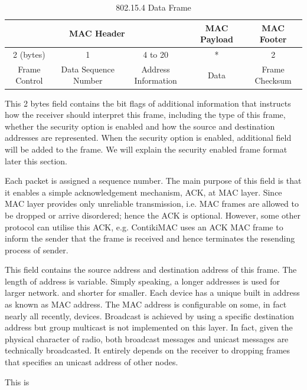 \begin{table}[]
\centering
\begin{tabular}{|c|c|c|c|c|}
\hline
\multicolumn{3}{|c|}{MAC Header}                           & MAC Payload & MAC Footer     \\ \hline
2 (bytes)     & 1                    & 4 to 20              & *           & 2              \\ \hline
Frame Control & Data Sequence Number & Address Information & Data        & Frame Checksum \\ \hline
\end{tabular}
\caption{802.15.4 Data Frame}
\label{Tbl: 802154 frame}
\end{table}

\begin{description}[style=nextline]
\item[\textbf{Frame Control}]
This 2 bytes field contains the bit flags of additional information that instructs how the receiver should interpret this frame, including the type of this frame, whether the security option is enabled and how the source and destination addresses are represented. When the security option is enabled, additional field will be added to the frame. We will explain the security enabled frame format later this section.

\item[\textbf{Data Sequence Number}]
Each packet is assigned a sequence number. The main purpose of this field is that it enables a simple acknowledgement mechanism, ACK, at MAC layer. Since MAC layer provides only unreliable transmission, i.e. MAC frames are allowed to be dropped or arrive disordered; hence the ACK is optional. However, some other protocol can utilise this ACK, e.g. ContikiMAC uses an ACK MAC frame to inform the sender that the frame is received and hence terminates the resending process of sender.

\item[\textbf{Address Information}]
This field contains the source address and destination address of this frame. The length of address is variable. Simply speaking, a longer addresses is used for larger network. and shorter for smaller. Each device has a unique built in address as known as MAC address. The MAC address is configurable on some, in fact nearly all recently, devices. Broadcast is achieved by using a specific destination address but group multicast is not implemented on this layer. In fact, given the physical character of radio, both broadcast messages and unicast messages are technically broadcasted. It entirely depends on the receiver to dropping frames that specifies an unicast address of other nodes.

\item[\textbf{Data}]

\item[\textbf[Frame Checksum]
This is 

\end{description}

